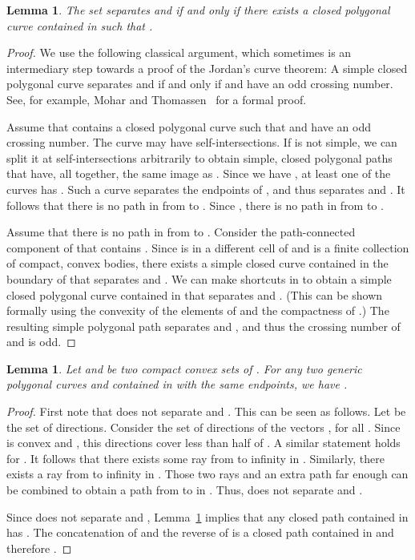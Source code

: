 \documentclass[a4paper,11pt]{article}
\newtheorem{lemma}[theorem]{Lemma}
\begin{document}
\begin{lemma}
\label{lem:parity_folklore}
	The set  separates  and  if and only if
	there exists a closed polygonal curve  contained in  
	such that .
\end{lemma}
\begin{proof}
	We use the following classical argument, 
	which sometimes is an intermediary step towards a proof of the Jordan's curve theorem:
	A simple closed polygonal curve  separates  and  if and only if 
	 and  have an odd crossing number. 
	See, for example, Mohar and Thomassen~\cite[Section 2.1]{mt-01} for a formal proof. 

	Assume that  contains a closed polygonal curve  
	such that  and  have an odd crossing number. 
	The curve  may have self-intersections.
	If  is not simple, we can split it at self-intersections arbitrarily to obtain
	simple, closed polygonal paths  that have, all together,
	the same image as . 
	Since we have ,
	at least one of the curves  has .
	Such a curve  separates the endpoints of , and thus separates  and .
	It follows that there is no path in  from  to .
	Since , there is no path in 
	from  to .

	Assume that there is no path in  from  to . 
	Consider the path-connected component  of  that contains . 
	Since  is in a different cell of 
	and  is a finite collection of compact, convex bodies, 
	there exists a simple closed curve  contained in the boundary of  that separates  and .
	We can make shortcuts in  to obtain a simple closed polygonal curve  contained in 
	that separates  and . (This can be shown formally using the convexity of
	the elements of  and the compactness of .)
	The resulting simple polygonal path  separates  and , and thus
	the crossing number of  and  is odd.
\end{proof}

\begin{lemma}
\label{lem:same}
	Let  and  be two compact convex sets of .
	For any two generic polygonal curves  and  contained in  
	with the same endpoints, we have .
\end{lemma}
\begin{proof}
	First note that  does not separate  and . This can be 
	seen as follows. Let  be the set of directions.
	Consider the set of directions of the vectors ,
	for all . Since  is convex and , this directions
	cover less than half of . A similar statement holds for .
	It follows that there exists some ray from  to infinity
	in . Similarly, there exists a ray from  to infinity
	in . Those two rays and an extra path far enough
	can be combined to obtain a path from  to  in . Thus,
	 does not separate  and . 

	Since  does not separate  and , 
	Lemma~\ref{lem:parity_folklore} implies that any closed path  contained
	in  has .
	The concatenation of  and the reverse of  is a closed path contained
	in  and therefore .
\end{proof}
\end{document}
